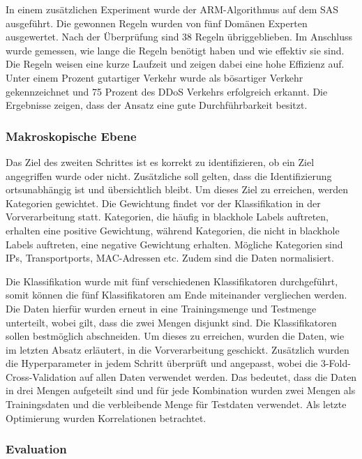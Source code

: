 \documentclass[sigplan,screen]{acmart}
\begin{document}
In einem zusätzlichen Experiment wurde der ARM-Algorithmus auf dem SAS ausgeführt. Die gewonnen Regeln wurden von fünf Domänen Experten ausgewertet. Nach der Überprüfung sind 38 Regeln übriggeblieben. Im Anschluss wurde gemessen, wie lange die Regeln benötigt haben und wie effektiv sie sind. Die Regeln weisen eine kurze Laufzeit und zeigen dabei eine hohe Effizienz auf. Unter einem Prozent gutartiger Verkehr wurde als bösartiger Verkehr gekennzeichnet und 75 Prozent des DDoS Verkehrs erfolgreich erkannt. Die Ergebnisse zeigen, dass der Ansatz eine gute Durchführbarkeit besitzt.

\subsubsection{Makroskopische Ebene}

Das Ziel des zweiten Schrittes ist es korrekt zu identifizieren, ob ein Ziel angegriffen wurde oder nicht. Zusätzliche soll gelten, dass die Identifizierung ortsunabhängig ist und übersichtlich bleibt. Um dieses Ziel zu erreichen, werden Kategorien gewichtet. Die Gewichtung findet vor der Klassifikation in der Vorverarbeitung statt. Kategorien, die häufig in blackhole Labels auftreten, erhalten eine positive Gewichtung, während Kategorien, die nicht in blackhole Labels auftreten, eine negative Gewichtung erhalten. Mögliche Kategorien sind IPs, Transportports, MAC-Adressen etc. Zudem sind die Daten normalisiert.

Die Klassifikation wurde mit fünf verschiedenen Klassifikatoren durchgeführt, somit können die fünf Klassifikatoren am Ende miteinander vergliechen werden. Die Daten hierfür wurden erneut in eine Trainingsmenge und Testmenge unterteilt, wobei gilt, dass die zwei Mengen disjunkt sind. Die Klassifikatoren sollen bestmöglich abschneiden. Um dieses zu erreichen, wurden die Daten, wie im letzten Absatz erläutert, in die Vorverarbeitung geschickt. Zusätzlich wurden die Hyperparameter in jedem Schritt überprüft und angepasst, wobei die 3-Fold-Cross-Validation auf allen Daten verwendet werden. Das bedeutet, dass die Daten in drei Mengen aufgeteilt sind und für jede Kombination wurden zwei Mengen als Trainingsdaten und die verbleibende Menge für Testdaten verwendet. Als letzte Optimierung wurden Korrelationen betrachtet.

\subsubsection{Evaluation}
\end{document}

